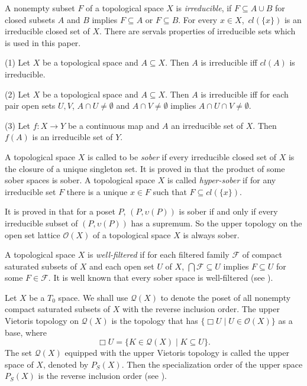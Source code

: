 \documentclass[preprint,12pt]{elsarticle}
\numberwithin{equation}{section}
\begin{document}
\quad  A nonempty subset $F$ of a topological space $X$ is {\em irreducible}, if $F\subseteq A\cup B$ for closed subsets $A$ and $B$ implies $F\subseteq A$ or $F\subseteq B$. For every $x\in X$,\ $cl(\{x\})$ is an irreducible closed set of $X$. There are servals properties of irreducible sets which is used in this paper.

(1) Let $X$ be a topological space and $A\subseteq X$. Then $A$ is irreducible iff $cl(A)$ is irreducible.

(2) Let $X$ be a topological space and $A\subseteq X$. Then $A$ is irreducible iff for each pair open sets $U,V$, $A\cap U\neq\emptyset$ and $A\cap V\neq\emptyset$ implies $A\cap U\cap V\neq\emptyset$.

(3) Let $f:X\longrightarrow Y$ be a continuous map and $A$ an irreducible set of $X$. Then $f(A)$ is an irreducible set of $Y$.




\quad A topological space $X$ is called to be {\em sober} if every irreducible closed set of $X$ is the closure of a unique singleton set. It is proved in  \cite{GG03} that the product of some sober spaces is sober.  A topological space $X$ is called {\em hyper-sober} if for any irreducible set $F$ there is a unique $x \in F$ such that $F \subseteq cl(\{x\})$.

\quad It is proved in \cite{KU13} that for a poset $P$, $(P,\upsilon(P))$ is sober if and only if every irreducible subset of $(P,\upsilon(P))$ has a supremum. So the upper topology on the open set lattice $\mathcal{O}(X)$ of a topological space $X$ is always sober.


\quad  A topological space $X$ is {\em well-filtered} if for each filtered family $\mathcal{F}$ of compact saturated subsets of $X$ and each open set $U$ of $X$, $\bigcap \mathcal{F}\subseteq U$ implies $F\subseteq U$ for some $F\in\mathcal{F}$. It is well known
that every sober space is well-filtered (see \cite{GG03}).


\quad Let $X$ be a $T_{0}$ space. We shall use $\mathcal{Q}(X)$ to denote the poset of all nonempty
compact saturated subsets of $X$ with the reverse inclusion order. The upper Vietoris topology on $\mathcal{Q}(X)$ is the topology that has $\{\Box U\mid U\in\mathcal{O}(X)\}$ as a base, where $$\Box U=\{K\in\mathcal{Q}(X)\mid K\subseteq U\}.$$ The set $\mathcal{Q}(X)$ equipped with the upper Vietoris topology is called the upper space of $X$, denoted by  $P_{S}(X)$. Then the specialization order of the upper space $P_{S}(X)$ is the reverse inclusion order (see \cite{AGL23,MU13,ANVB75}).
\end{document}
